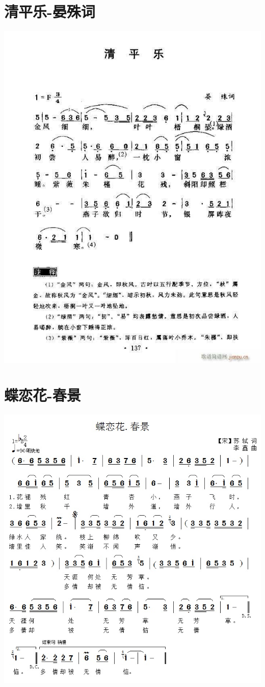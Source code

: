 \documentclass[cn,pad,chinese]{elegantbook}
\begin{document}
\section{清平乐-晏殊词}
    \includegraphics[width=\textwidth]{dongxiao/20200411-清平乐-晏殊.jpg}
\section{蝶恋花-春景}
    \includegraphics[width=\textwidth]{dongxiao/20200411-蝶恋花-春景.jpg}
\end{document}
